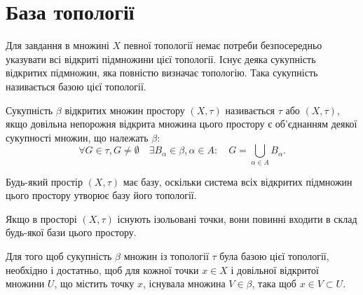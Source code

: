 \section{База топології}

Для завдання в множині $X$ певної топології немає
потреби безпосередньо указувати всі відкриті підмножини
цієї топології. Існує деяка сукупність відкритих підмножин,
яка повністю визначає топологію. Така сукупність
називається базою цієї топології.

\begin{definition}
Сукупність $\beta$ відкритих множин простору
$(X, \tau)$ називається  $\tau$ або 
$(X, \tau)$, якщо довільна непорожня відкрита множина цього
простору є об'єднанням деякої сукупності множин, що
належать $\beta$: \[ \forall G \in \tau, G \ne \emptyset \quad \exists B_\alpha \in \beta, \alpha \in A: \quad G = \bigcup_{\alpha \in A} B_\alpha. \]
\end{definition}

\begin{remark}
Будь-який простір $(X, \tau)$ має базу,
оскільки система всіх відкритих підмножин цього простору
утворює базу його топології.
\end{remark}

\begin{remark}
Якщо в просторі $(X, \tau)$ існують
ізольовані точки, вони повинні входити в склад будь-якої
бази цього простору.
\end{remark}

\begin{theorem}
Для того щоб сукупність $\beta$ множин із
топології $\tau$ була базою цієї топології, необхідно і
достатньо, щоб для кожної точки $x \in X$ і довільної
відкритої множини $U$, що містить точку $x$, існувала
множина $V \in \beta$, така щоб $x \in V \subset U$.
\end{theorem}


